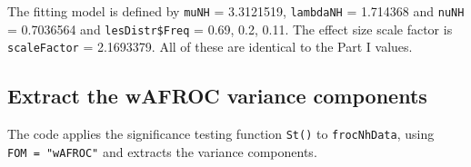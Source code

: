 \documentclass[
]{book}
\newenvironment{Shaded}{\begin{snugshade}}{\end{snugshade}}
\newcommand{\AttributeTok}[1]{\textcolor[rgb]{0.77,0.63,0.00}{#1}}
\newcommand{\CommentTok}[1]{\textcolor[rgb]{0.56,0.35,0.01}{\textit{#1}}}
\newcommand{\DecValTok}[1]{\textcolor[rgb]{0.00,0.00,0.81}{#1}}
\newcommand{\FunctionTok}[1]{\textcolor[rgb]{0.00,0.00,0.00}{#1}}
\newcommand{\NormalTok}[1]{#1}
\newcommand{\OtherTok}[1]{\textcolor[rgb]{0.56,0.35,0.01}{#1}}
\newcommand{\SpecialCharTok}[1]{\textcolor[rgb]{0.00,0.00,0.00}{#1}}
\newcommand{\StringTok}[1]{\textcolor[rgb]{0.31,0.60,0.02}{#1}}
\begin{document}
\begin{Shaded}
\end{Shaded}

The fitting model is defined by \texttt{muNH} = 3.3121519, \texttt{lambdaNH} = 1.714368 and \texttt{nuNH} = 0.7036564 and \texttt{lesDistr\$Freq} = 0.69, 0.2, 0.11. The effect size scale factor is \texttt{scaleFactor} = 2.1693379. All of these are identical to the Part I values.

\hypertarget{froc-sample-size-variance-components}{%
\subsection{Extract the wAFROC variance components}\label{froc-sample-size-variance-components}}

The code applies the significance testing function \texttt{St()} to \texttt{frocNhData}, using \texttt{FOM\ =\ "wAFROC"} and extracts the variance components.

\begin{Shaded}
\end{Shaded}
\end{document}
